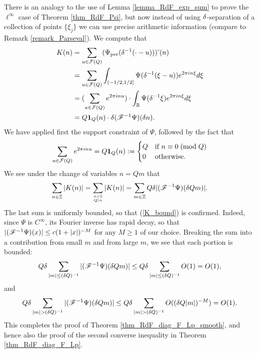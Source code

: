 \documentclass[oneside,11pt]{amsart}
\begin{document}
 
  There is an analogy to the use of Lemma \ref{lemma_RdF_exp_sum} to prove the $\ell^\infty$ case of Theorem \ref{thm_RdF_Psi}, but now instead of using $\delta$-separation of a collection of points $\{\xi_j\}$ we can use precise arithmetic information (compare to Remark \ref{remark_Parseval}).
   We   compute that
 \begin{align*}
  K(n)  & = \sum_{u \in \mathcal{F}(Q)} (\Psi_{\mathrm{per}} (\delta^{-1}(\cdot - u)))\check{\;} (n)  \\
  & =   \sum_{u \in \mathcal{F}(Q)} \int_{(-1/2,1/2]} \Psi  (\delta^{-1}(\xi - u)) e^{2\pi i n \xi} d\xi\\
  & = ( \sum_{u \in \mathcal{F}(Q)} e^{2\pi i n   u}) \cdot  \int_{\mathbb{R}} \Psi(\delta^{-1}\xi) e^{2\pi i n \xi} d\xi  \\
  & = Q \boldsymbol1_Q(n) \cdot  \delta (\mathscr{F}^{-1}\Psi)(\delta n) .
  \end{align*}
 We have applied first the support constraint of $\Psi$,  followed by the fact that 
 \[   \sum_{u \in \mathcal{F}(Q)} e^{2\pi i n   u} = Q\boldsymbol1_{Q}(n)
 	 := \begin{cases} Q & \text{if $n \equiv 0 \; ( \text{mod} \; Q)$} \\
	 				0 & \text{otherwise}.\end{cases}\]
We see under the change of variables $n=Qm$ that 
\[ \sum_{n \in \mathbb{Z}}|K(n)|  = \sum_{n \in \mathbb{Z} \atop Q|n}|K(n)|  = \sum_{m \in \mathbb{Z}}  Q\delta |(\mathscr{F}^{-1}\Psi)(\delta Qm)|. \]
The last sum is uniformly bounded, so that (\ref{K_bound}) is confirmed. Indeed, since  $\Psi$ is $C^\infty$, its Fourier inverse has rapid decay, so that  $|(\mathscr{F}^{-1}\Psi)(x)| \leq c(1+|x|)^{-M}$ for any $M \geq 1$ of our choice. Breaking the sum into a contribution from small $m$ and from large $m$, we see that each portion is bounded: 
\[ Q\delta\sum_{|m| \leq (\delta Q)^{-1}}   |(\mathscr{F}^{-1}\Psi)(\delta Qm)| \leq Q\delta \sum_{|m| \leq (\delta Q)^{-1}} O(1) = O(1), \]
and 
\[ Q\delta \sum_{|m| > (\delta Q)^{-1}}  |(\mathscr{F}^{-1}\Psi)(\delta Qm)| \leq Q\delta \sum_{|m| > (\delta Q)^{-1}} O((\delta Q |m|)^{-M}) = O(1). \]
This completes the proof of Theorem \ref{thm_RdF_diag_F_Lp_smooth}, and hence also   the proof of 
the second converse inequality in Theorem \ref{thm_RdF_diag_F_Lp}.

		
 

 
\end{document}
